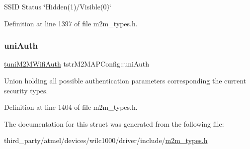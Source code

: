 S\+S\+ID Status \char`\"{}\+Hidden(1)/\+Visible(0)\char`\"{} 

Definition at line 1397 of file m2m\+\_\+types.\+h.

\mbox{\label{structtstrM2MAPConfig_a131f76e7c154d35841cfbaac680e58b8}} 
\subsubsection{\texorpdfstring{uni\+Auth}{uniAuth}}
{\footnotesize\ttfamily \hyperlink{uniontuniM2MWifiAuth}{tuni\+M2\+M\+Wifi\+Auth} tstr\+M2\+M\+A\+P\+Config\+::uni\+Auth}

Union holding all possible authentication parameters corresponding the current security types. 

Definition at line 1404 of file m2m\+\_\+types.\+h.



The documentation for this struct was generated from the following file\+:\begin{DoxyCompactItemize}
\item 
third\+\_\+party/atmel/devices/wilc1000/driver/include/\hyperlink{m2m__types_8h}{m2m\+\_\+types.\+h}\end{DoxyCompactItemize}
